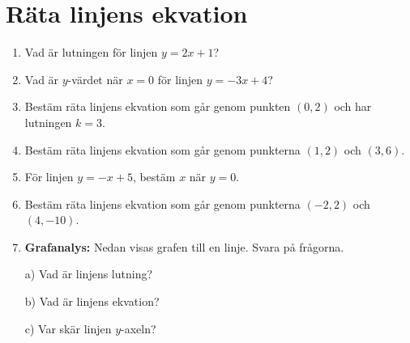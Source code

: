 \documentclass[a4paper,11pt]{article}
\begin{document}
\newpage
\section{Räta linjens ekvation}
\begin{enumerate}[label=\textbf{\arabic*.}]
    \item Vad är lutningen för linjen $y = 2x + 1$?
    \item Vad är $y$-värdet när $x = 0$ för linjen $y = -3x + 4$?
    \item Bestäm räta linjens ekvation som går genom punkten $(0,2)$ och har lutningen $k=3$.
    \item Bestäm räta linjens ekvation som går genom punkterna $(1,2)$ och $(3,6)$.
    \item För linjen $y = -x + 5$, bestäm $x$ när $y = 0$.
    \item Bestäm räta linjens ekvation som går genom punkterna $(-2,2)$ och $(4,-10)$.
    \item \textbf{Grafanalys:} Nedan visas grafen till en linje. Svara på frågorna.
    \begin{center}
    \end{center}
    a) Vad är linjens lutning?
    
    b) Vad är linjens ekvation?
    
    c) Var skär linjen $y$-axeln?
\end{enumerate}
\newpage
\end{document}
